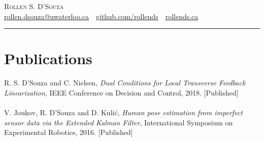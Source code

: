 \documentclass[oneside, 10pt]{memoir}
\begin{document}
\newcommand{\entryGeneral}[4]{
    \textbf{#2} \sourceatright{#1}
    \emph{#3}
    \begin{adjustwidth}{1em}{0em}
        #4
    \end{adjustwidth}
    \hfill
}

\newcommand{\entrySimple}[3]{
    \textbf{#2} \sourceatright{#1}
    \begin{adjustwidth}{1em}{0em}
        #3
    \end{adjustwidth}
    \hfill
}

%

\LARGE{\textsc{Rollen S. D'Souza}}\\
\small{\url{rollen.dsouza@uwaterloo.ca}~\textbullet~\url{github.com/rollends}~\textbullet~\url{rollends.ca} }\\
\rule{\linewidth}{0.4pt}

\section*{Publications}
\begin{adjustwidth}{1em}{0em}%
R. S. D'Souza and C. Nielsen, \emph{Dual Conditions for Local Transverse Feedback Linearization}, IEEE Conference on Decision and Control, 2018. [Published] \hfill \\
\hfill \\
V. Joukov, R. D'Souza and D. Kuli\'{c}, \emph{Human pose estimation from imperfect sensor data via the Extended Kalman 
Filter}, International Symposium on Experimental Robotics, 2016. [Published]
\end{adjustwidth}
\end{document}
